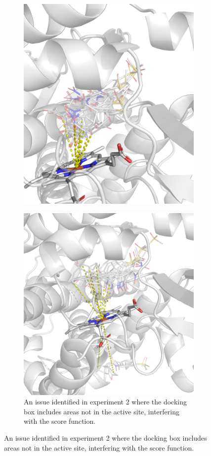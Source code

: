 \documentclass{article}
\begin{document}
\begin{figure}[H]
\begin{subfigure}{0.49\textwidth}
		\includegraphics[width=\linewidth]{figs/exp2-best-aff-dock.png}
	\end{subfigure}
	\begin{subfigure}{0.49\textwidth}
		\caption{\label{exp2-issue} An issue identified in experiment 2 where the docking box includes areas not in the active site, interfering with the score function.}
		\includegraphics[width=\linewidth]{figs/exp2-issue.png}
	\end{subfigure}
\end{figure}
\end{document}
